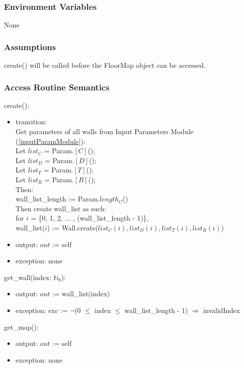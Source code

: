 \documentclass[12pt, titlepage]{article}
\begin{document}
\subsubsection{Environment Variables} None

\subsubsection{Assumptions} create() will be called before the FloorMap object can be accessed.

\subsubsection{Access Routine Semantics}

\noindent create():
\begin{itemize}
\item transition: \\
Get parameters of all walls from Input Parameters Module (\autoref{inputParamModule}):\\
Let $list_C$ = Param.$[C]$();\\
Let $list_D$ = Param.$[D]$();\\
Let $list_T$ = Param.$[T]$();\\
Let $list_R$ = Param.$[R]$();\\
Then:\\
wall\_list\_length := Param.$length_C$()\\
Then create wall\_list as such:\\
for $i$ = \{0, 1, 2, ... , (wall\_list\_length - 1)\},\\
\indent\indent wall\_list($i$) := Wall.create($list_C(i), list_D(i), list_T(i), list_R(i)$)
\item output: $out$ := self
\item exception: none
\end{itemize}

\noindent get\_wall(index: $\mathbb{N}_0$):
\begin{itemize}
\item output: $out$ := wall\_list(index)
\item exception: exc := $\neg$(0 $\leq$ index $\leq$ wall\_list\_length - 1) $\Rightarrow$ invalidIndex
\end{itemize}

\noindent get\_map():
\begin{itemize}
\item output: $out$ := self
\item exception: none
\end{itemize}
\end{document}
